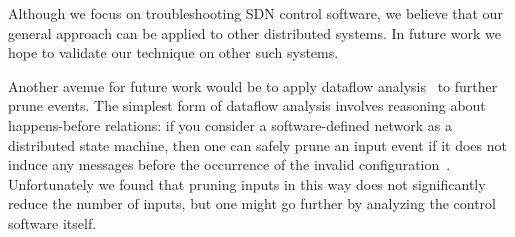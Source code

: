 
Although we focus on
troubleshooting SDN control software, we believe that our general approach can
be applied to other distributed systems.
In future work we hope to validate our
technique on other such systems. %

 Another avenue for future work would be to apply
dataflow
analysis~\cite{Lee:2011:TGR:1993498.1993528,tallam2007enabling}
to further prune events.
The simplest form of dataflow analysis involves
reasoning about happens-before relations: if you consider a
software-defined network as a distributed state machine,
then one can safely prune an input event if
it does not induce any messages before
the occurrence of the invalid
configuration~\cite{Lamport:1978:TCO:359545.359563}.
Unfortunately we found that pruning inputs in this way does not
significantly reduce the number of inputs, but one might go further by
analyzing the control software itself.


